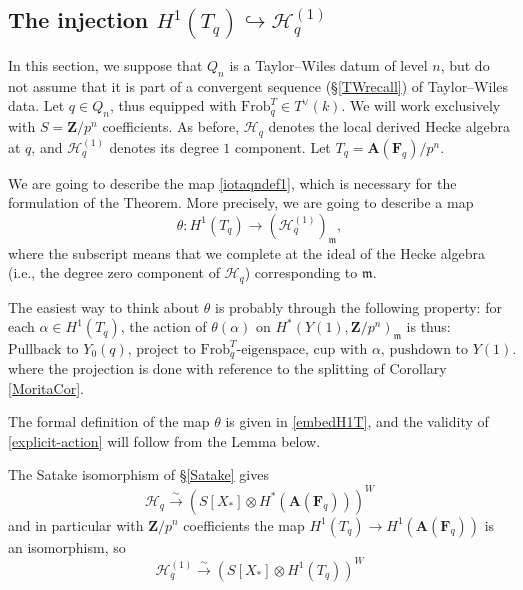 \documentclass[10pt]{amsart}
\newcommand{\Z}{\mathbf{Z}}
\newcommand{\Frob}{\mathrm{Frob}}
\theoremstyle{remark}
\newcommand{\F}{\mathbf{F}}
\begin{document}
 

%
%
%
%
%
%
%
%
%
%
%
%
%
%
%
%
%
%
%
%
%
%
%
%
 

 \subsection{The injection $H^1(T_q) \hookrightarrow \mathscr{H}_q^{(1)}$} \label{Vnaction}  
 
 
 In this section, we suppose that $Q_n$ is a Taylor--Wiles datum of level $n$, but do not assume  that it is part of a convergent sequence (\S \ref{TWrecall}) of Taylor--Wiles data. 
 Let $q \in Q_n$, thus equipped with $\Frob_q^T \in T^{\vee}(k)$.   We will work exclusively with $S=\Z/p^n$ coefficients. 
   As before, $\mathscr{H}_q$ denotes the local derived Hecke algebra at $q$, and $\mathscr{H}_q^{(1)}$ denotes its degree $1$ component. 
   Let
   $T_q = \mathbf{A}(\F_q)/p^n.$ 
   
 
 We are going to describe the map \eqref{iotaqndef1}, which is necessary for the formulation of the Theorem. 
More precisely, we are going to describe a map \begin{equation} \label{thetaref} \theta: H^1(T_q) \rightarrow  \left( \mathscr{H}_q^{(1)}\right)_{\mathfrak{m}},\end{equation}
  where the subscript means that we complete at the ideal of the Hecke algebra  (i.e., the degree zero component of $\mathscr{H}_q$) 
 corresponding to $\mathfrak{m}$. 
 
 The easiest way to think about $\theta$ is probably through  the following property: 
for each $\alpha \in H^1(T_q)$, the action of $\theta(\alpha)$ on $H^*(Y(1), \Z/p^n)_{\mathfrak{m}}$ is thus: 
   \begin{equation}  \label{explicit-action} \mbox{Pullback to $Y_0(q)$, project
 to $\Frob^T_q$-eigenspace,  cup with  $\alpha$,  pushdown to $Y(1)$. } \end{equation} 
 where the projection is done
 with reference to the splitting 
 of Corollary \ref{MoritaCor}.  
 
  The formal definition of the map $\theta$ is given in
\eqref{embedH1T}, and the validity of \eqref{explicit-action} will follow from the Lemma below.

  
 
 \medskip
 
 The Satake isomorphism of \S \ref{Satake} gives
 $$\mathscr{H}_q \stackrel{\sim}{\longrightarrow}  \left(  S[X_*] \otimes  H^*(\mathbf{A}(\F_q) ) \right)^W$$
 and in particular with $\Z/p^n$ coefficients the map $H^1(T_q) \rightarrow H^1(\mathbf{A}(\F_q))$ is an isomorphism, so 
  $$\mathscr{H}_q ^{(1)}\stackrel{\sim}{\longrightarrow}  \left(  S[X_*] \otimes  H^1(T_q ) \right)^W$$
\end{document}

